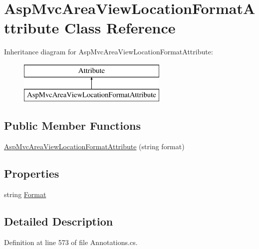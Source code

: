 \hypertarget{class_asp_mvc_area_view_location_format_attribute}{}\section{Asp\+Mvc\+Area\+View\+Location\+Format\+Attribute Class Reference}
\label{class_asp_mvc_area_view_location_format_attribute}
Inheritance diagram for Asp\+Mvc\+Area\+View\+Location\+Format\+Attribute\+:\begin{figure}[H]
\begin{center}
\leavevmode
\includegraphics[height=2.000000cm]{class_asp_mvc_area_view_location_format_attribute}
\end{center}
\end{figure}
\subsection*{Public Member Functions}
\begin{DoxyCompactItemize}
\item 
\hyperlink{class_asp_mvc_area_view_location_format_attribute_a27bac0c5e55099e7d35be1f54f361a44}{Asp\+Mvc\+Area\+View\+Location\+Format\+Attribute} (string format)
\end{DoxyCompactItemize}
\subsection*{Properties}
\begin{DoxyCompactItemize}
\item 
string \hyperlink{class_asp_mvc_area_view_location_format_attribute_ac3d03e8d1371c427048f84046c327e0e}{Format}
\end{DoxyCompactItemize}


\subsection{Detailed Description}


Definition at line 573 of file Annotations.\+cs.



